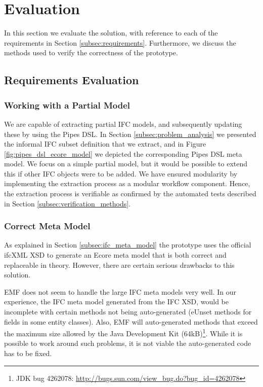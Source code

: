 \section{Evaluation}
\label{sec:evaluation}
In this section we evaluate the solution, with reference to each of the requirements in Section \ref{subsec:requirements}. Furthermore, we discuss the methods used to verify the correctness of the prototype.


\subsection{Requirements Evaluation}
\label{subsec:requirements_evaluation}
\subsubsection{Working with a Partial Model}
We are capable of extracting partial IFC models, and subsequently updating these by using the Pipes DSL. In Section \ref{subsec:problem_analysis} we presented the informal IFC subset definition that we extract, and in Figure \ref{fig:pipes_dsl_ecore_model} we depicted the corresponding Pipes DSL meta model. We focus on a simple partial model, but it would be possible to extend this if other IFC objects were to be added. We have ensured modularity by implementing the extraction process as a modular workflow component. Hence, the extraction process is verifiable as confirmed by the automated tests described in Section \ref{subsec:verification_methods}.

\subsubsection{Correct Meta Model} As explained in Section \ref{subsec:ifc_meta_model} the prototype uses the official ifcXML XSD to generate an Ecore meta model that is both correct and replaceable in theory. However, there are certain serious drawbacks to this solution.

EMF does not seem to handle the large IFC meta models very well. In our experience, the IFC meta model generated from the IFC XSD, would be incomplete with certain methods not being auto-generated (eUnset methods for fields in some entity classes). Also, EMF will auto-generated methods that exceed the maximum size allowed by the Java Development Kit (64kB)\footnote{JDK bug 4262078: \url{http://bugs.sun.com/view_bug.do?bug_id=4262078}}. While it is possible to work around such problems, it is not viable the auto-generated code has to be fixed.

